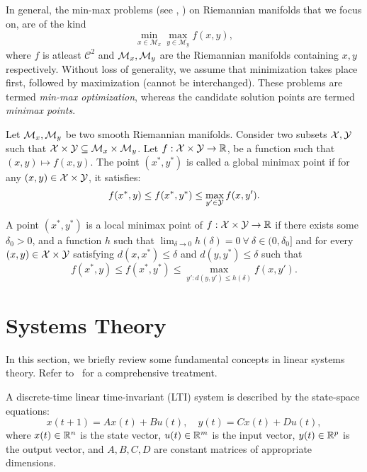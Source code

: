 \begin{definition}
In general, the min-max problems (see \cite{han2023}, \cite{han2024}) on Riemannian manifolds that we focus on, are of the kind
\[
\min_{x \in \mathcal{M}_x} \max_{y \in \mathcal{M}_y} f(x,y),
\]
where $f$ is atleast $\mathcal{C}^2$ and $\mathcal{M}_x,\mathcal{M}_y$ are the Riemannian manifolds containing $x,y$ respectively. Without loss of generality, we assume that minimization takes place first, followed by maximization (cannot be interchanged). These problems are termed \emph{min-max optimization}, whereas the candidate solution points are termed \emph{minimax points}. 

\end{definition}
\begin{definition}
\label{def:global-minimax}
    Let $\mathcal{M}_x, \mathcal{M}_y$ be two smooth Riemannian manifolds. Consider two subsets $\mathcal{X}, \mathcal{Y}$ such that $\mathcal{X} \times \mathcal{Y} \subseteq \mathcal{M}_x \times \mathcal{M}_y$. Let $f: \mathcal{X} \times \mathcal{Y} \to \mathbb{R}$, be a function such that $(x,y) \mapsto f(x,y)$. The point $(x^*, y^*)$ is called a global minimax point if for any $(x,y) \in \mathcal{X} \times \mathcal{Y}$, it satisfies:
    \[
    f(x^*,y) \leq f(x^*, y^*) \leq \max_{y' \in \mathcal{Y}} f(x, y').
    \]
\end{definition}
\begin{definition}
\label{def:local-minimax}
A point $(x^*, y^*)$ is a local minimax point of $f: \mathcal{X} \times \mathcal{Y} \to \mathbb{R}$ if there exists some $\delta_0 > 0$, and a function $h$ such that $\lim_{\delta \to 0} h(\delta) = 0 \ \forall \ \delta \in (0, \delta_0]$ and for every $(x,y) \in \mathcal{X} \times \mathcal{Y}$ satisfying $d(x,x^*) \leq \delta$ and $d(y,y^*) \leq \delta$ such that
\[
f(x^*, y) \leq f(x^*, y^*) \leq \max_{y': d(y,y') \leq h(\delta)} f(x,y').
\]
\end{definition}

\section{Systems Theory}
In this section, we briefly review some fundamental concepts in linear systems theory. Refer to~\cite{hespanha} for a comprehensive treatment.

\begin{definition}
 \label{def:lti}
    A discrete-time linear time-invariant (LTI) system is described by the state-space equations:
    \[
        x(t+1) = A x(t) + B u(t), \quad y(t) = C x(t) + D u(t),
    \]
    where $x(t) \in \mathbb{R}^n$ is the state vector, $u(t) \in \mathbb{R}^m$ is the input vector, $y(t) \in \mathbb{R}^p$ is the output vector, and $A, B, C, D$ are constant matrices of appropriate dimensions.
\end{definition}

